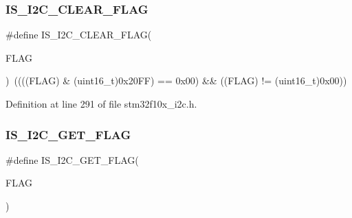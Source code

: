 \subsubsection{\texorpdfstring{I\+S\+\_\+\+I2\+C\+\_\+\+C\+L\+E\+A\+R\+\_\+\+F\+L\+AG}{IS\_I2C\_CLEAR\_FLAG}}
{\footnotesize\ttfamily \#define I\+S\+\_\+\+I2\+C\+\_\+\+C\+L\+E\+A\+R\+\_\+\+F\+L\+AG(\begin{DoxyParamCaption}\item[{}]{F\+L\+AG }\end{DoxyParamCaption})~((((F\+L\+AG) \& (uint16\+\_\+t)0x20\+F\+F) == 0x00) \&\& ((\+F\+L\+A\+G) != (uint16\+\_\+t)0x00))}



Definition at line 291 of file stm32f10x\+\_\+i2c.\+h.

\mbox{\label{group___i2_c__flags__definition_ga1a2c2a7c50cd8e33e532918106b4f6ce}} 
\subsubsection{\texorpdfstring{I\+S\+\_\+\+I2\+C\+\_\+\+G\+E\+T\+\_\+\+F\+L\+AG}{IS\_I2C\_GET\_FLAG}}
{\footnotesize\ttfamily \#define I\+S\+\_\+\+I2\+C\+\_\+\+G\+E\+T\+\_\+\+F\+L\+AG(\begin{DoxyParamCaption}\item[{}]{F\+L\+AG }\end{DoxyParamCaption})}

